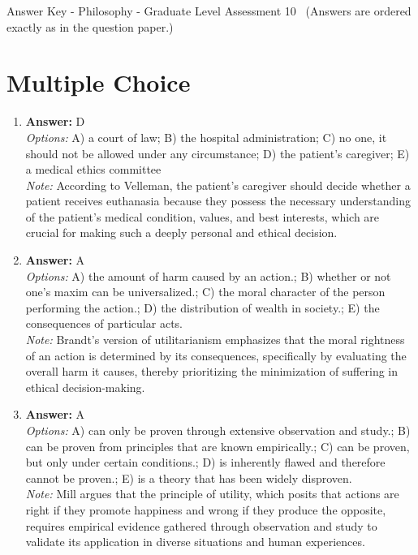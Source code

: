 \documentclass[12pt]{article}
\begin{document}
\begin{center}
Answer Key - Philosophy - Graduate Level Assessment 10 \
\small (Answers are ordered exactly as in the question paper.)
\end{center}

\section*{Multiple Choice}
\begin{enumerate}[label=\arabic*.]
\item \textbf{Answer:} D
\\ \textit{Options:} A) a court of law; B) the hospital administration; C) no one, it should not be allowed under any circumstance; D) the patient's caregiver; E) a medical ethics committee
\\ \textit{Note:} According to Velleman, the patient's caregiver should decide whether a patient receives euthanasia because they possess the necessary understanding of the patient's medical condition, values, and best interests, which are crucial for making such a deeply personal and ethical decision.
\item \textbf{Answer:} A
\\ \textit{Options:} A) the amount of harm caused by an action.; B) whether or not one's maxim can be universalized.; C) the moral character of the person performing the action.; D) the distribution of wealth in society.; E) the consequences of particular acts.
\\ \textit{Note:} Brandt's version of utilitarianism emphasizes that the moral rightness of an action is determined by its consequences, specifically by evaluating the overall harm it causes, thereby prioritizing the minimization of suffering in ethical decision-making.
\item \textbf{Answer:} A
\\ \textit{Options:} A) can only be proven through extensive observation and study.; B) can be proven from principles that are known empirically.; C) can be proven, but only under certain conditions.; D) is inherently flawed and therefore cannot be proven.; E) is a theory that has been widely disproven.
\\ \textit{Note:} Mill argues that the principle of utility, which posits that actions are right if they promote happiness and wrong if they produce the opposite, requires empirical evidence gathered through observation and study to validate its application in diverse situations and human experiences.

\end{enumerate}
\end{document}
